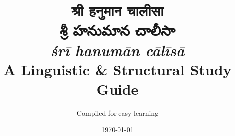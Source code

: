 \documentclass[12pt, a4paper]{article}
\newcommand{\deva}[1]{{\devanagarifont #1}}
\newcommand{\telu}[1]{{\telugufont #1}}
\begin{document}
\title{
    \textbf{ \deva{श्री हनुमान चालीसा}}\\ 
    \telu{శ్రీ హనుమాన చాలీసా} \\  
    \textit{śrī hanumān cālīsā} \\  
    \Large A Linguistic \& Structural Study Guide
}
\author{Compiled for easy learning}
\date{\today}
\maketitle

\tableofcontents
\newpage













\end{document}
